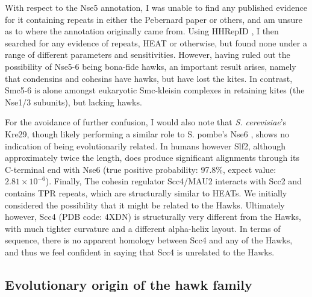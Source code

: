 \documentclass[a4paper,11pt,twoside,openright]{scrbook}
\begin{document}
With respect to the Nse5 annotation, I was unable to find any published evidence for it containing repeats in either the Pebernard paper or others, and am unsure as to where the annotation originally came from. Using HHRepID \cite{Biegert2008}, I then searched for any evidence of repeats, HEAT or otherwise, but found none under a range of different parameters and sensitivities. However, having ruled out the possibility of Nse5-6 being bona-fide hawks, an important result arises, namely that condensins and cohesins have hawks, but have lost the kites. In contrast, Smc5-6 is alone amongst eukaryotic Smc-kleisin complexes in retaining kites (the Nse1/3 subunits), but lacking hawks.

For the avoidance of further confusion, I would also note that \textit{S. cerevisiae}'s Kre29, though likely performing a similar role to S. pombe’s Nse6 \cite{Duan2009}, shows no indication of being evolutionarily related. In humans however Slf2, although approximately twice the length, does produce significant alignments through its C-terminal end with Nse6 (true positive probability: 97.8\%, expect value: $2.81\times10^{-6}$). Finally, The cohesin regulator Scc4/MAU2 interacts with Scc2 and contains TPR repeats, which are structurally similar to HEATs. We initially considered the possibility that it might be related to the Hawks. Ultimately however, Scc4 (PDB code: 4XDN) is structurally very different from the Hawks, with much tighter curvature and a different alpha-helix layout. In terms of sequence, there is no apparent homology between Scc4 and any of the Hawks, and thus we feel confident in saying that Scc4 is unrelated to the Hawks.

\subsection{Evolutionary origin of the hawk family}
\end{document}
